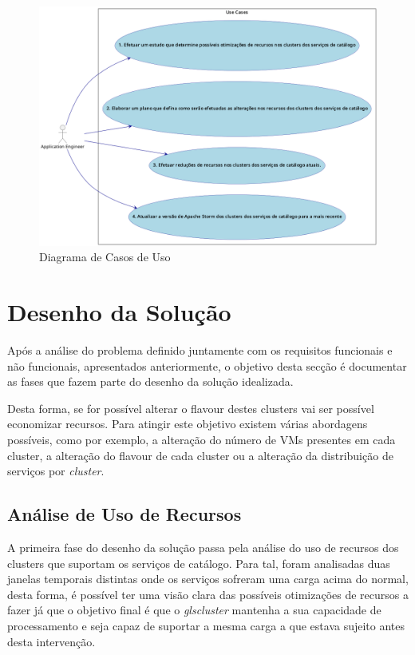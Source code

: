 \begin{figure}[H]
  \centerline{\includegraphics[scale=0.4]{media/content/analise/ucd.png}}
  \caption{Diagrama de Casos de Uso}
  \label{dcu}
\end{figure}

\section{Desenho da Solução}

Após a análise do problema definido juntamente com os requisitos funcionais e não funcionais,
apresentados anteriormente, o objetivo desta secção é documentar as fases que fazem parte do
desenho da solução idealizada.

Desta forma, se for possível alterar o \gls{flavour} destes \glspl{cluster} vai ser possível economizar
recursos. Para atingir este objetivo existem várias abordagens possíveis, como por exemplo, a
alteração do número de \acp{VM} presentes em cada \gls{cluster}, a alteração do \gls{flavour}
de cada \gls{cluster} ou a alteração da distribuição de serviços por \textit{\gls{cluster}}.

\subsection{Análise de Uso de Recursos}

A primeira fase do desenho da solução passa pela análise do uso de recursos dos \glspl{cluster}
que suportam os serviços de catálogo. Para tal, foram analisadas duas janelas temporais distintas
onde os serviços sofreram uma carga acima do normal, desta forma, é possível ter uma visão clara
das possíveis otimizações de recursos a fazer já que o objetivo final é que o \textit{gls{cluster}}
mantenha a sua capacidade de processamento e seja capaz de suportar a mesma carga a que estava
sujeito antes desta intervenção.

